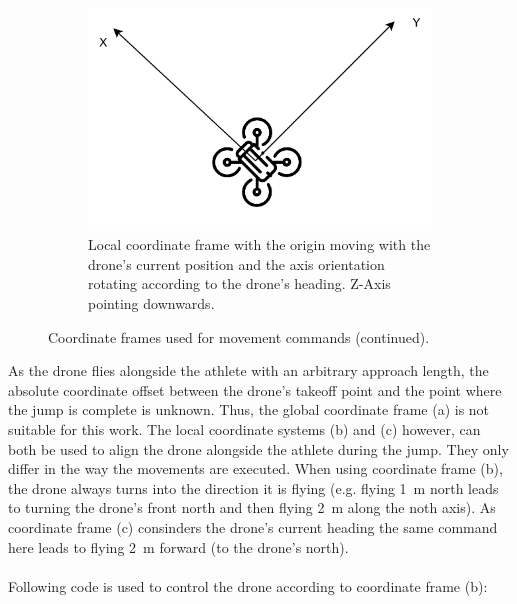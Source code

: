 \begin{figure}[htbp]
    \ContinuedFloat
    \centering
    \begin{subfigure}{1.0\textwidth}
        \centering
        \includegraphics[scale=0.8]{coordinate_frames_local_heading.pdf}
        \caption{Local coordinate frame with the origin moving with the
        drone's current position and the axis orientation rotating according
        to the drone's heading. Z-Axis pointing downwards.}
    \end{subfigure}
    \caption*{Coordinate frames used for movement commands (continued).}
\end{figure}
\FloatBarrier
\noindent As the drone flies alongside the athlete with an arbitrary approach
length, the absolute coordinate offset between the drone's takeoff point
and the point where the jump is complete is unknown.
Thus, the global coordinate frame (a) is not suitable for this work.
The local coordinate systems (b) and (c) however, can both be used to align
the drone alongside the athlete during the jump.
They only differ in the way the movements are executed.
When using coordinate frame (b), the drone always turns into the direction it
is flying (e.g. flying 1~m north leads to turning the drone's front north and
then flying 2~m along the noth axis).
As coordinate frame (c) consinders the drone's current heading the same
command here leads to flying 2~m forward (to the drone's north).\\\\
Following code is used to control the drone according to coordinate frame (b):

